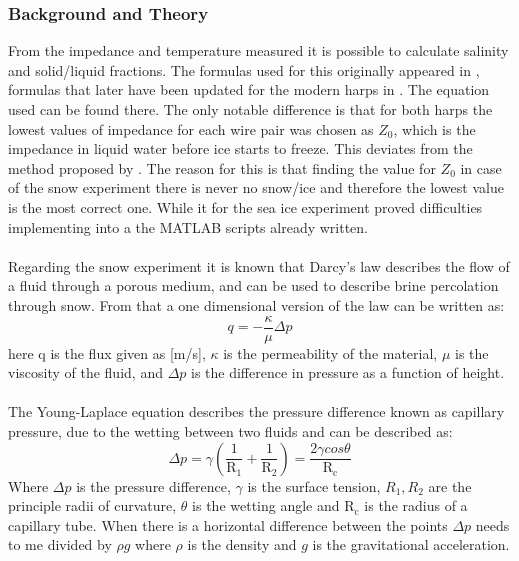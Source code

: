 \subsubsection{Background and Theory}
From the impedance and temperature measured it is possible to calculate salinity and solid/liquid fractions. The formulas used for this originally appeared in \textcite{Notz}, formulas that later have been updated for the modern harps in \textcite{Fuchs}. The equation used can be found there. The only notable difference is that for both harps the lowest values of impedance for each wire pair was chosen as
$Z_0$, which is the impedance in liquid water before ice starts to freeze. This deviates from the method proposed by \textcite{Fuchs}. The reason for this is that finding the value for $Z_0$ in case of the snow experiment there is never no snow/ice and therefore the lowest value is the most correct one. While it for the sea ice experiment proved difficulties implementing into a the MATLAB scripts already written.\\ 
\\
Regarding the snow experiment it is known that Darcy's law describes the flow of a fluid through a porous medium, and can be used to describe brine percolation through snow. From that a one dimensional version of the law can be written as:
\begin{equation}
  q = -\frac{\kappa}{\mu}\Delta p
\end{equation}
here q is the flux given as [m/s], $\kappa$ is the permeability of the material, $\mu$ is the viscosity of the fluid, and $\Delta p$ is the difference in pressure as a function of height.\\
\\
The Young-Laplace equation describes the pressure difference known as capillary pressure, due to the wetting between two fluids and can be described as:
\begin{equation}
  \Delta p = \gamma \left( \frac{1}{\text{R}_1} + \frac{1}{\text{R}_2} \right) = \frac{2\gamma cos\theta}{\text{R}_\text{c}}
\end{equation}
Where $\Delta p$ is the pressure difference, $\gamma$ is the surface tension, $R_1, R_2$ are the principle radii of curvature, $\theta$ is the wetting angle and $\text{R}_\text{c}$ is the radius of a capillary tube. When there is a horizontal difference between the points $\Delta p$ needs to me divided by $\rho g$ where $\rho$ is the density and $g$ is the gravitational acceleration.

